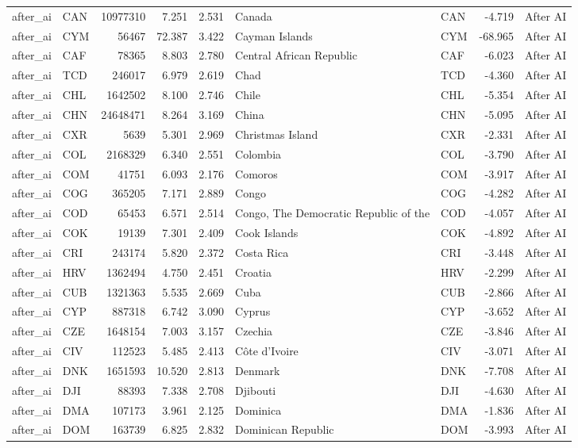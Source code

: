 \begin{tabular}{llrrrllrl}
after\_ai & CAN & 10977310 & 7.251 & 2.531 & Canada & CAN & -4.719 & After AI \\
after\_ai & CYM & 56467 & 72.387 & 3.422 & Cayman Islands & CYM & -68.965 & After AI \\
after\_ai & CAF & 78365 & 8.803 & 2.780 & Central African Republic & CAF & -6.023 & After AI \\
after\_ai & TCD & 246017 & 6.979 & 2.619 & Chad & TCD & -4.360 & After AI \\
after\_ai & CHL & 1642502 & 8.100 & 2.746 & Chile & CHL & -5.354 & After AI \\
after\_ai & CHN & 24648471 & 8.264 & 3.169 & China & CHN & -5.095 & After AI \\
after\_ai & CXR & 5639 & 5.301 & 2.969 & Christmas Island & CXR & -2.331 & After AI \\
after\_ai & COL & 2168329 & 6.340 & 2.551 & Colombia & COL & -3.790 & After AI \\
after\_ai & COM & 41751 & 6.093 & 2.176 & Comoros & COM & -3.917 & After AI \\
after\_ai & COG & 365205 & 7.171 & 2.889 & Congo & COG & -4.282 & After AI \\
after\_ai & COD & 65453 & 6.571 & 2.514 & Congo, The Democratic Republic of the & COD & -4.057 & After AI \\
after\_ai & COK & 19139 & 7.301 & 2.409 & Cook Islands & COK & -4.892 & After AI \\
after\_ai & CRI & 243174 & 5.820 & 2.372 & Costa Rica & CRI & -3.448 & After AI \\
after\_ai & HRV & 1362494 & 4.750 & 2.451 & Croatia & HRV & -2.299 & After AI \\
after\_ai & CUB & 1321363 & 5.535 & 2.669 & Cuba & CUB & -2.866 & After AI \\
after\_ai & CYP & 887318 & 6.742 & 3.090 & Cyprus & CYP & -3.652 & After AI \\
after\_ai & CZE & 1648154 & 7.003 & 3.157 & Czechia & CZE & -3.846 & After AI \\
after\_ai & CIV & 112523 & 5.485 & 2.413 & Côte d'Ivoire & CIV & -3.071 & After AI \\
after\_ai & DNK & 1651593 & 10.520 & 2.813 & Denmark & DNK & -7.708 & After AI \\
after\_ai & DJI & 88393 & 7.338 & 2.708 & Djibouti & DJI & -4.630 & After AI \\
after\_ai & DMA & 107173 & 3.961 & 2.125 & Dominica & DMA & -1.836 & After AI \\
after\_ai & DOM & 163739 & 6.825 & 2.832 & Dominican Republic & DOM & -3.993 & After AI \\

\end{tabular}
